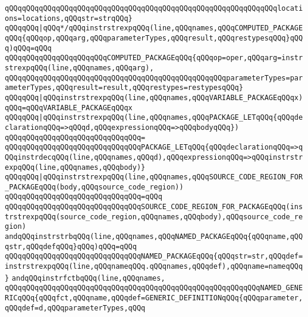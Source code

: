 \verb|qQQqqQQqqQQqqQQqqQQqqQQqqQQqqQQqqQQqqQQqqQQqqQQqqQQqqQQqqQQqqQQqlocations=locations,qQQqstr=strqQQq}|\newline
\verb|qQQqqQQq|\verb#|qQQq*/qQQqinstrstrexpqQQq(line,qQQqnames,qQQqCOMPUTED_PACKAGEqQQq{qQQqop,qQQqarg,qQQqparameterTypes,qQQqresult,qQQqrestypesqQQq}qQQq)qQQq=qQQq#\newline
\verb|qQQqqQQqqQQqqQQqqQQqqQQqCOMPUTED_PACKAGEqQQq{qQQqop=oper,qQQqarg=instrstrexpqQQq(line,qQQqnames,qQQqarg),|\newline
\verb|qQQqqQQqqQQqqQQqqQQqqQQqqQQqqQQqqQQqqQQqqQQqqQQqqQQqparameterTypes=parameterTypes,qQQqresult=result,qQQqrestypes=restypesqQQq}|\newline
\verb|qQQqqQQq|\verb#|qQQqinstrstrexpqQQq(line,qQQqnames,qQQqVARIABLE_PACKAGEqQQqx)qQQq=qQQqVARIABLE_PACKAGEqQQqx#\newline
\verb|qQQqqQQq|\verb#|qQQqinstrstrexpqQQq(line,qQQqnames,qQQqPACKAGE_LETqQQq{qQQqdeclarationqQQq=>qQQqd,qQQqexpressionqQQq=>qQQqbodyqQQq})#\newline
\verb|qQQqqQQqqQQqqQQqqQQqqQQqqQQqqQQq=|\newline
\verb|qQQqqQQqqQQqqQQqqQQqqQQqqQQqqQQqPACKAGE_LETqQQq{qQQqdeclarationqQQq=>qQQqinstrdecqQQq(line,qQQqnames,qQQqd),qQQqexpressionqQQq=>qQQqinstrstrexpqQQq(line,qQQqnames,qQQqbody)}|\newline
\verb|qQQqqQQq|\verb#|qQQqinstrstrexpqQQq(line,qQQqnames,qQQqSOURCE_CODE_REGION_FOR_PACKAGEqQQq(body,qQQqsource_code_region))#\newline
\verb|qQQqqQQqqQQqqQQqqQQqqQQqqQQqqQQq=qQQq|\newline
\verb|qQQqqQQqqQQqqQQqqQQqqQQqqQQqqQQqSOURCE_CODE_REGION_FOR_PACKAGEqQQq(instrstrexpqQQq(source_code_region,qQQqnames,qQQqbody),qQQqsource_code_region)|\newline
\newline
\verb|andqQQqinstrstrbqQQq(line,qQQqnames,qQQqNAMED_PACKAGEqQQq{qQQqname,qQQqstr,qQQqdefqQQq}qQQq)qQQq=qQQq|\newline
\verb|qQQqqQQqqQQqqQQqqQQqqQQqqQQqqQQqNAMED_PACKAGEqQQq{qQQqstr=str,qQQqdef=instrstrexpqQQq(line,qQQqnameqQQq.qQQqnames,qQQqdef),qQQqname=nameqQQq}|\newline
\newline
\verb|andqQQqinstrfctbqQQq(line,qQQqnames,|\newline
\verb|qQQqqQQqqQQqqQQqqQQqqQQqqQQqqQQqqQQqqQQqqQQqqQQqqQQqqQQqqQQqNAMED_GENERICqQQq{qQQqfct,qQQqname,qQQqdef=GENERIC_DEFINITIONqQQq{qQQqparameter,qQQqdef=d,qQQqparameterTypes,qQQq|\newline
